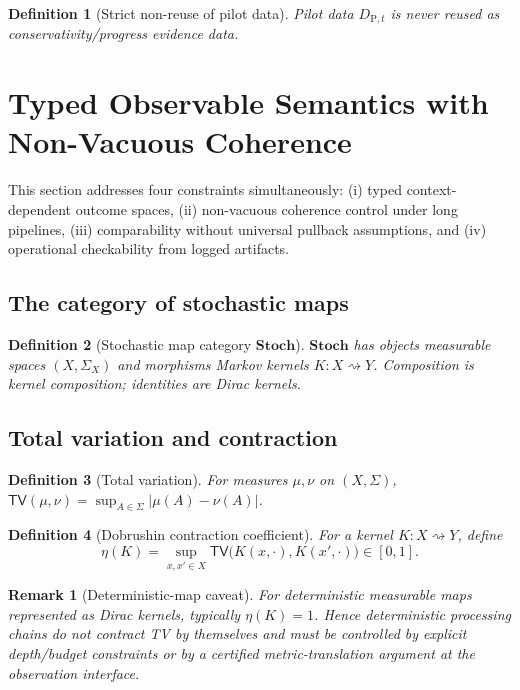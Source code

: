 \documentclass[11pt,a4paper]{article}
\newtheorem{definition}{Definition}[section]
\newtheorem{remark}{Remark}[section]
\newcommand{\Stoch}{\mathbf{Stoch}}
\newcommand{\TV}{\mathsf{TV}}
\begin{document}
\begin{definition}[Strict non-reuse of pilot data]
Pilot data $D_{\mathrm{P},t}$ is never reused as conservativity/progress evidence data.
\end{definition}

\section{Typed Observable Semantics with Non-Vacuous Coherence}

This section addresses four constraints simultaneously:
(i) typed context-dependent outcome spaces,
(ii) non-vacuous coherence control under long pipelines,
(iii) comparability without universal pullback assumptions, and
(iv) operational checkability from logged artifacts.

\subsection{The category of stochastic maps}
\begin{definition}[Stochastic map category $\Stoch$]
$\Stoch$ has objects measurable spaces $(X,\Sigma_X)$ and morphisms Markov kernels $K:X\rightsquigarrow Y$.
Composition is kernel composition; identities are Dirac kernels.
\end{definition}

\subsection{Total variation and contraction}
\begin{definition}[Total variation]
For measures $\mu,\nu$ on $(X,\Sigma)$,
$\TV(\mu,\nu)=\sup_{A\in\Sigma}|\mu(A)-\nu(A)|$.
\end{definition}

\begin{definition}[Dobrushin contraction coefficient]
For a kernel $K:X\rightsquigarrow Y$, define
\[
\eta(K)=\sup_{x,x'\in X}\TV\bigl(K(x,\cdot),K(x',\cdot)\bigr)\in[0,1].
\]
\end{definition}

\begin{remark}[Deterministic-map caveat]
For deterministic measurable maps represented as Dirac kernels, typically $\eta(K)=1$.
Hence deterministic processing chains do not contract TV by themselves and must be controlled by explicit depth/budget constraints or by a certified metric-translation argument at the observation interface.
\end{remark}
\end{document}
